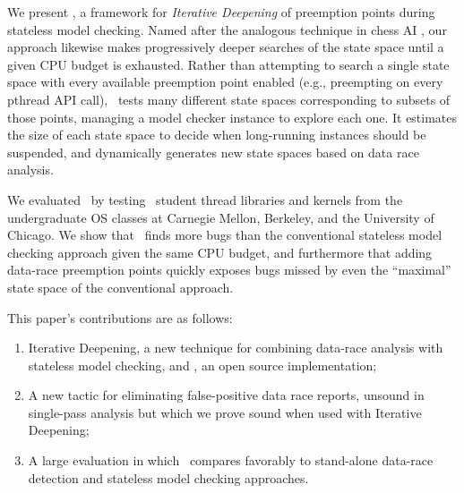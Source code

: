 We present \quicksand, a framework for {\em Iterative Deepening} of preemption points during stateless model checking.
Named after the analogous technique in chess AI \cite{iterative-deepening-chess}, our approach likewise makes progressively deeper searches of the state space until a given CPU budget is exhausted.
Rather than attempting to search a single state space with every available preemption point enabled (e.g., preempting on every pthread API call),
\quicksand~tests many different state spaces corresponding to subsets of those points, managing a model checker instance to explore each one.
It estimates the size of each state space to decide when long-running instances should be suspended, and dynamically generates new state spaces based on data race analysis.

We evaluated \quicksand~by testing \numstudence~student thread libraries and kernels from the undergraduate OS classes at Carnegie Mellon, Berkeley, and the University of Chicago.
We show that \quicksand~finds more bugs than the conventional stateless model checking approach given the same CPU budget,
and furthermore that adding data-race preemption points quickly exposes bugs missed by even the ``maximal'' state space of the conventional approach.

This paper's contributions are as follows:
\begin{enumerate}
	\item Iterative Deepening, a new technique for combining data-race analysis with stateless model checking, and \quicksand, an open source implementation;
	\item A new tactic for eliminating false-positive data race reports, unsound in single-pass analysis but which we prove sound when used with Iterative Deepening;
	\item A large evaluation in which \quicksand~compares favorably to stand-alone data-race detection and stateless model checking approaches.
\end{enumerate}
